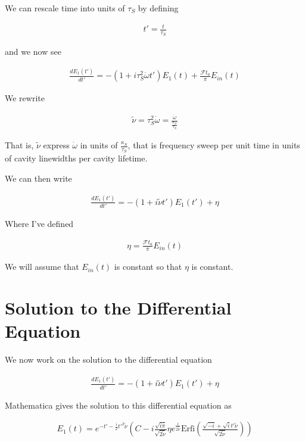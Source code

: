 \documentclass[12pt]{article}
\begin{document}
We can rescale time into units of $\tau_S$ by defining

\begin{align}
t' = \frac{t}{\tau_S}
\end{align}

and we now see

\begin{align}
\frac{dE_1(t')}{dt'} = -(1 + i\tau_S^2 \dot{\omega} t')E_1(t) + \frac{\mathcal{F}t_a}{\pi}E_{in}(t)
\end{align}

We rewrite

\begin{align}
\tilde{\nu} = \tau_S^2 \dot{\omega} = \frac{\dot{\omega}}{\frac{\kappa_S}{\tau_S}}
\end{align}

That is, $\tilde{\nu}$ express $\dot{\omega}$ in units of $\frac{\kappa_S}{\tau_S}$, that is frequency sweep per unit time in units of cavity linewidths per cavity lifetime.

We can then write

\begin{align}
\frac{dE_1(t')}{dt'} = -(1+i\tilde{\nu}t')E_1(t') + \eta
\end{align}

Where I've defined

\begin{align}
\eta = \frac{\mathcal{F}t_a}{\pi}E_{in}(t)
\end{align}

We will assume that $E_{in}(t)$ is constant so that $\eta$ is constant.

\section{Solution to the Differential Equation}

We now work on the solution to the differential equation

\begin{align}
\frac{dE_1(t')}{dt'} = -(1+i\tilde{\nu}t')E_1(t') + \eta
\end{align}

Mathematica gives the solution to this differential equation as

\begin{align}
E_1(t) = e^{-t' -\frac{i}{2} t'^{2} \tilde{\nu}}\left(C - i \frac{\sqrt{i \pi}}{\sqrt{2\tilde{\nu}}} \eta e^{\frac{i}{2\tilde{\nu}}} \text{Erfi}\left(\frac{\sqrt{-i} + \sqrt{i} t' \tilde{\nu}}{\sqrt{2\tilde{\nu}}}\right)\right)
\end{align}
\end{document}
